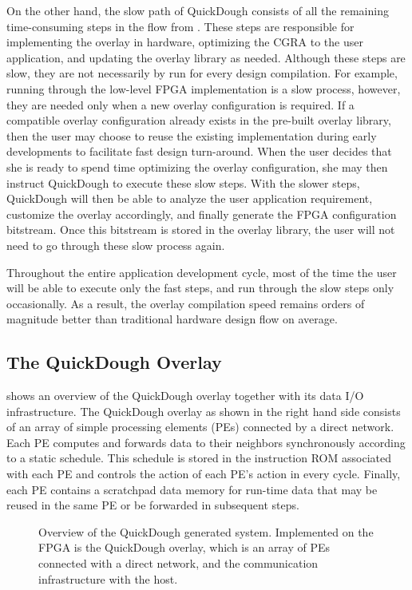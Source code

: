 On the other hand, the slow path of QuickDough consists of all the remaining time-consuming steps in the flow from .
These steps are responsible for implementing the overlay in hardware, optimizing the CGRA to the user application, and updating the overlay library as needed.
Although these steps are slow, they are not necessarily by run for every design compilation.
For example, running through the low-level FPGA implementation is a slow process, however, they are needed only when a new overlay configuration is required.
If a compatible overlay configuration already exists in the pre-built overlay library, then the user may choose to reuse the existing implementation during early developments to facilitate fast design turn-around.
When the user decides that she is ready to spend time optimizing the overlay configuration, she may then instruct QuickDough to execute these slow steps.  With the slower steps, QuickDough will then be able to analyze the user application requirement, customize the overlay accordingly, and finally generate the FPGA configuration bitstream.
Once this bitstream is stored in the overlay library, the user will not need to go through these slow process again.

Throughout the entire application development cycle, most of the time the user will be able to execute only the fast steps, and run through the slow steps only occasionally.
As a result, the overlay compilation speed remains orders of magnitude better than traditional hardware design flow on average.

\subsection{The QuickDough Overlay}
 shows an overview of the QuickDough overlay together with its data I/O infrastructure.
The QuickDough overlay as shown in the right hand side consists of an array of simple processing elements (PEs) connected by a direct network.
Each PE computes and forwards data to their neighbors synchronously according to a static schedule.
This schedule is stored in the instruction ROM associated with each PE and controls the action of each PE's action in every cycle.
Finally, each PE contains a scratchpad data memory for run-time data that may be reused in the same PE or be forwarded in subsequent steps.

\begin{figure}
    \caption{Overview of the QuickDough generated system.  Implemented on the FPGA is the QuickDough overlay, which is an array of PEs connected with a direct network, and the communication infrastructure with the host.}
    \label{fig:qd_overlay}
\end{figure}

